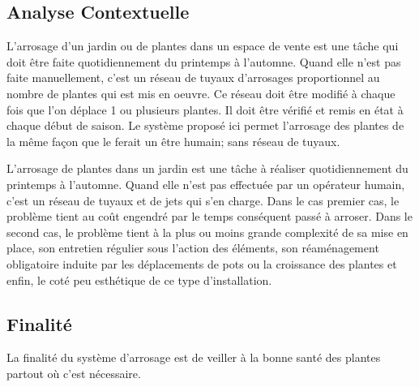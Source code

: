 \textcolor[RGB]{46, 116, 181}{\chapter{Analyse Contextuelle}}
L'arrosage d'un jardin ou de plantes dans un espace de vente est une tâche qui doit être faite quotidiennement du printemps à l'automne.
Quand elle n'est pas faite manuellement, c'est un réseau de tuyaux d'arrosages proportionnel au nombre de plantes qui est mis en oeuvre.
Ce réseau doit être modifié à chaque fois que l'on déplace 1 ou plusieurs plantes. Il doit être vérifié et remis en état à chaque début de saison.
Le système proposé ici permet l'arrosage des plantes de la même façon que le ferait un être humain; sans réseau de tuyaux.


\samir
{
L'arrosage de plantes dans un jardin est une tâche à réaliser quotidiennement du printemps à l'automne.
Quand elle n'est pas effectuée par un opérateur humain, c'est un réseau de tuyaux et de jets qui s'en charge.
Dans le cas premier cas, le problème tient au coût engendré par le temps conséquent passé à arroser.
Dans le second cas, le problème tient à la plus ou moins grande complexité de sa mise en place, son entretien régulier sous l'action des éléments, son réaménagement obligatoire induite par les déplacements de pots ou la croissance des plantes et enfin, le coté peu esthétique de ce type d'installation.
}





\section{Finalité}
La finalité du système d'arrosage est de veiller à la bonne santé des plantes partout où c'est nécessaire.

